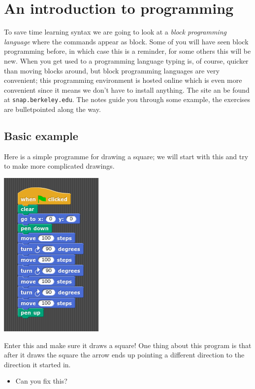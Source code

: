 \documentclass[11pt,a4paper]{scrartcl}
\begin{document}
\section*{An introduction to programming}

To save time learning syntax we are going to look at a \textsl{block
  programming language} where the commands appear as block. Some of
you will have seen block programming before, in which case this is a
reminder, for some others this will be new. When you get used to a
programming language typing is, of course, quicker than moving blocks
around, but block programming languages are very convenient; this
programming environment is hosted online which is even more convenient
since it means we don't have to install anything. The site an be found
at \texttt{snap.berkeley.edu}. The notes guide you through some
example, the exercises are bulletpointed along the way.

\subsection*{Basic example}

Here is a simple programme for drawing a square; we will start with
this and try to make more complicated drawings.
\begin{center}
\includegraphics{basic_square.png}
\end{center}
Enter this and make sure it draws a square! One thing about this
program is that after it draws the square the arrow ends up pointing a
different direction to the direction it started in. 
\begin{itemize}
\item Can you fix this?
\end{itemize}
\end{document}
